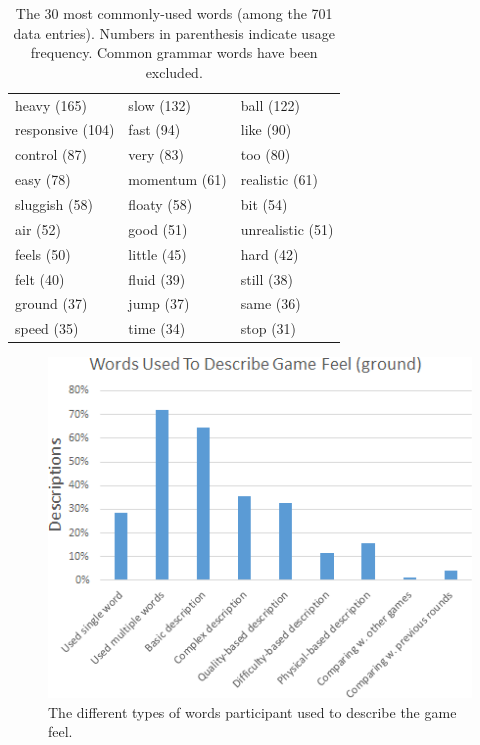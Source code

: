 \begin{table} \centering
\caption{The 30 most commonly-used words (among the 701 data entries). Numbers in parenthesis indicate usage frequency. Common grammar words have been excluded.}
\label{table:mostWords}
\begin{tabular}{lll}
\toprule
heavy (165) & slow (132) & ball (122)\\
responsive (104) & fast (94) & like (90)\\
control (87) & very (83) & too (80)\\ 
easy (78) & momentum (61) & realistic (61)\\
sluggish (58) & floaty (58) & bit (54)\\
air  (52) & good (51) & unrealistic (51)\\
feels (50) & little (45) & hard (42)\\
felt (40) & fluid (39) & still (38)\\
ground (37) & jump (37) & same (36)\\
speed (35) & time (34) & stop (31)\\
\bottomrule
\end{tabular}
\end{table}

\begin{figure}[htbp]
\centering
\includegraphics[width=\columnwidth]{Pics/coding1}
\caption{The different types of words participant used to describe the game feel.}
\label{fig:coding1}
\end{figure}



